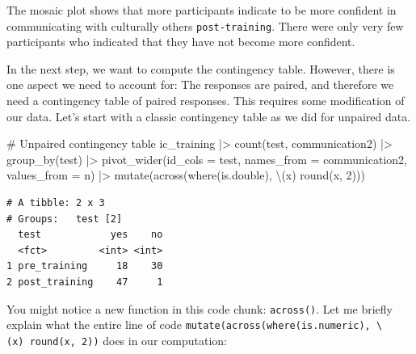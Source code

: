 \documentclass[
  letterpaper,
]{krantz}
\makeatletter
\newenvironment{Shaded}{\begin{snugshade}}{\end{snugshade}}
\newcommand{\AttributeTok}[1]{\textcolor[rgb]{0.40,0.45,0.13}{#1}}
\newcommand{\CommentTok}[1]{\textcolor[rgb]{0.37,0.37,0.37}{#1}}
\newcommand{\DecValTok}[1]{\textcolor[rgb]{0.68,0.00,0.00}{#1}}
\newcommand{\FunctionTok}[1]{\textcolor[rgb]{0.28,0.35,0.67}{#1}}
\newcommand{\NormalTok}[1]{\textcolor[rgb]{0.00,0.23,0.31}{#1}}
\newcommand{\SpecialCharTok}[1]{\textcolor[rgb]{0.37,0.37,0.37}{#1}}
\newenvironment{kframe}{%
\medskip{}
\setlength{\fboxsep}{.8em}
 \def\at@end@of@kframe{}%
 \ifinner\ifhmode%
  \def\at@end@of@kframe{\end{minipage}}%
  \begin{minipage}{\columnwidth}%
 \fi\fi%
 \def\FrameCommand##1{\hskip\@totalleftmargin \hskip-\fboxsep
 \colorbox{shadecolor}{##1}\hskip-\fboxsep
     \hskip-\linewidth \hskip-\@totalleftmargin \hskip\columnwidth}%
 \MakeFramed {\advance\hsize-\width
   \@totalleftmargin\z@ \linewidth\hsize
   \@setminipage}}%
 {\par\unskip\endMakeFramed%
 \at@end@of@kframe}
\renewenvironment{Shaded}{\begin{kframe}}{\end{kframe}}
\makeatother
\begin{document}
The mosaic plot shows that more participants indicate to be more
confident in communicating with culturally others
\texttt{post-training}. There were only very few participants who
indicated that they have not become more confident.

In the next step, we want to compute the contingency table. However,
there is one aspect we need to account for: The responses are paired,
and therefore we need a contingency table of paired responses. This
requires some modification of our data. Let's start with a classic
contingency table as we did for unpaired data.

\begin{Shaded}
\begin{Highlighting}[]
\CommentTok{\# Unpaired contingency table}
\NormalTok{ic\_training }\SpecialCharTok{|\textgreater{}}
  \FunctionTok{count}\NormalTok{(test, communication2) }\SpecialCharTok{|\textgreater{}}
  \FunctionTok{group\_by}\NormalTok{(test) }\SpecialCharTok{|\textgreater{}}
  \FunctionTok{pivot\_wider}\NormalTok{(}\AttributeTok{id\_cols =}\NormalTok{ test,}
              \AttributeTok{names\_from =}\NormalTok{ communication2,}
              \AttributeTok{values\_from =}\NormalTok{ n) }\SpecialCharTok{|\textgreater{}}
  \FunctionTok{mutate}\NormalTok{(}\FunctionTok{across}\NormalTok{(}\FunctionTok{where}\NormalTok{(is.double), \textbackslash{}(x) }\FunctionTok{round}\NormalTok{(x, }\DecValTok{2}\NormalTok{)))}
\end{Highlighting}
\end{Shaded}

\begin{verbatim}
# A tibble: 2 x 3
# Groups:   test [2]
  test            yes    no
  <fct>         <int> <int>
1 pre_training     18    30
2 post_training    47     1
\end{verbatim}

You might notice a new function in this code chunk: \texttt{across()}.
Let me briefly explain what the entire line of code
\texttt{mutate(across(where(is.numeric),\ \textbackslash{}(x)\ round(x,\ 2))}
does in our computation:
\end{document}
